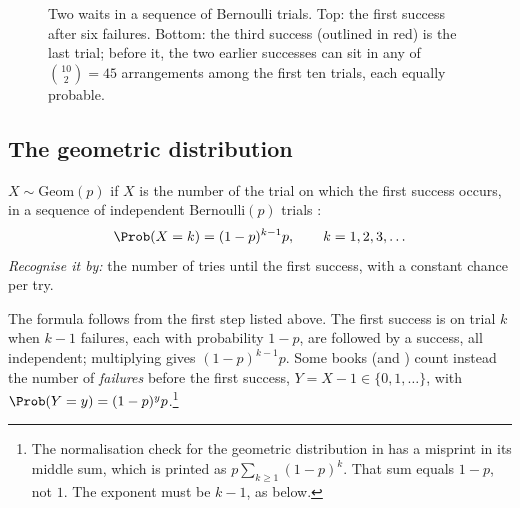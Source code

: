 \begin{figure}[htbp]
\centering
{}
\caption{Two waits in a sequence of Bernoulli trials. Top: the first success after six failures. Bottom: the third success (outlined in red) is the last trial; before it, the two earlier successes can sit in any of $\binom{10}2=45$ arrangements among the first ten trials, each equally probable.}
\label{2a:fig:trials-wait}
\end{figure}

\subsection{The geometric distribution}

\begin{workdef}
$X\sim\mathrm{Geom}(p)$ if $X$ is the number of the trial on which the first success occurs, in a sequence of independent Bernoulli$(p)$ trials :
\begin{equation}
  \Prob(X=k)=(1-p)^{k-1}p,\qquad k=1,2,3,\dots \label{2a:eq:geom}
\end{equation}
\emph{Recognise it by:} the number of tries until the first success, with a constant chance per try.
\end{workdef}

The formula follows from the first step listed above. The first success is on trial $k$ when $k-1$ failures, each with probability $1-p$, are followed by a success, all independent; multiplying gives $(1-p)^{k-1}p$. Some books (and ) count instead the number of \emph{failures} before the first success, $Y=X-1\in\{0,1,\dots\}$, with $\Prob(Y=y)=(1-p)^yp$.\footnote{The normalisation check for the geometric distribution in  has a misprint in its middle sum, which is printed as $p\sum_{k\ge1}(1-p)^k$. That sum equals $1-p$, not $1$. The exponent must be $k-1$, as below.}

